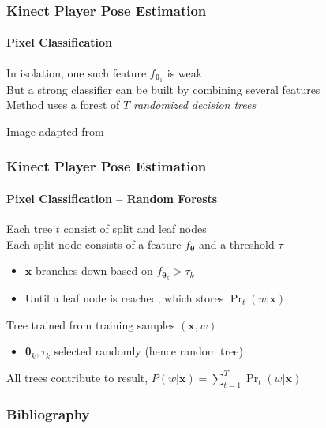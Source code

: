 \documentclass[xetex,professionalfont]{beamer}
\renewcommand{\vec}[1]{\ensuremath{\mathbf{#1}}}
\newcommand{\vx}{\vec{x}}
\newcommand{\bth}{\boldsymbol{\theta}}
\begin{document}

\begin{frame}
\frametitle{Kinect Player Pose Estimation}
\framesubtitle{Pixel Classification}

In isolation, one such feature $f_{\bth_1}$ is weak\\\medskip
But a strong classifier can be built by combining several features\\\medskip 
Method uses a forest of $T$ \emph{randomized decision trees} %

\bigskip
\begin{center}
    {\centering Image adapted from \cite{shotton2011}}
\end{center}

\end{frame}


\begin{frame}
\frametitle{Kinect Player Pose Estimation}
\framesubtitle{Pixel Classification -- Random Forests}

Each tree $t$ consist of split and leaf nodes\\\medskip
Each split node consists of a feature $f_{\bth}$ and a threshold $\tau$
\begin{itemize}
    \item $\vx$ branches down based on $f_{\bth_k}>\tau_k$
    \item Until a leaf node is reached, which stores $\Pr_t(w|\vx)$
\end{itemize}

\bigskip
Tree trained from training samples $(\vx,w)$ %
\begin{itemize}
    \item $\bth_k,\tau_k$ selected randomly (hence random tree)
\end{itemize}

\bigskip
All trees contribute to result, $P(w|\vx)=\sum_{t=1}^T \Pr_t(w|\vx)$

\end{frame}


\begin{frame}[allowframebreaks=0.9]
\frametitle{Bibliography}

\printbibliography

\end{frame}
\end{document}
